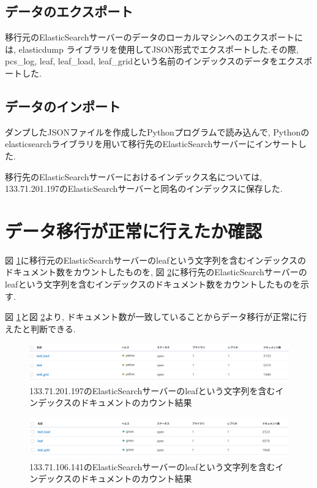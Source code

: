 \documentclass[a4j,12pt,]{jarticle}
\begin{document}
\subsection{データのエクスポート}
移行元のElasticSearchサーバーのデータのローカルマシンへのエクスポートには, elasticdump \cite{1}ライブラリを使用してJSON形式でエクスポートした.その際, pcs\_log, leaf, leaf\_load, leaf\_gridという名前のインデックスのデータをエクスポートした.

\subsection{データのインポート}
ダンプしたJSONファイルを作成したPythonプログラムで読み込んで, Pythonのelasticsearchライブラリを用いて移行先のElasticSearchサーバーにインサートした.

移行先のElasticSearchサーバーにおけるインデックス名については, 133.71.201.197のElasticSearchサーバーと同名のインデックスに保存した.

\section{データ移行が正常に行えたか確認}
図 \ref{p2}に移行元のElasticSearchサーバーのleafという文字列を含むインデックスのドキュメント数をカウントしたものを, 図 \ref{p3}に移行先のElasticSearchサーバーのleafという文字列を含むインデックスのドキュメント数をカウントしたものを示す.

図 \ref{p2}と図 \ref{p3}より, ドキュメント数が一致していることからデータ移行が正常に行えたと判断できる.

\begin{figure}[H]
  \begin{center}
    \includegraphics[width=160mm]{197leaf.png}
    \caption{133.71.201.197のElasticSearchサーバーのleafという文字列を含むインデックスのドキュメントのカウント結果}
    \label{p2}
  \end{center}
\end{figure}

\begin{figure}[H]
  \begin{center}
    \includegraphics[width=160mm]{141leaf.png}
    \caption{133.71.106.141のElasticSearchサーバーのleafという文字列を含むインデックスのドキュメントのカウント結果}
    \label{p3}
  \end{center}
\end{figure}
\end{document}
